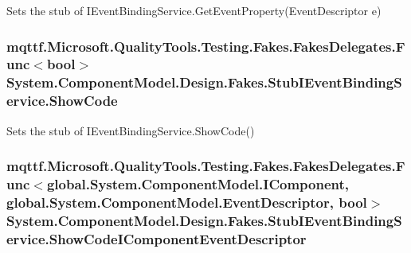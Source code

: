 Sets the stub of I\-Event\-Binding\-Service.\-Get\-Event\-Property(\-Event\-Descriptor e)

\hypertarget{class_system_1_1_component_model_1_1_design_1_1_fakes_1_1_stub_i_event_binding_service_a83adfa25a76ad4d628cec51592cec090}{
\subsubsection[{Show\-Code}]{\setlength{\rightskip}{0pt plus 5cm}mqttf.\-Microsoft.\-Quality\-Tools.\-Testing.\-Fakes.\-Fakes\-Delegates.\-Func$<$bool$>$ System.\-Component\-Model.\-Design.\-Fakes.\-Stub\-I\-Event\-Binding\-Service.\-Show\-Code}}\label{class_system_1_1_component_model_1_1_design_1_1_fakes_1_1_stub_i_event_binding_service_a83adfa25a76ad4d628cec51592cec090}


Sets the stub of I\-Event\-Binding\-Service.\-Show\-Code()

\hypertarget{class_system_1_1_component_model_1_1_design_1_1_fakes_1_1_stub_i_event_binding_service_a83e763ecbb9331896d2846ef0342cadc}{
\subsubsection[{Show\-Code\-I\-Component\-Event\-Descriptor}]{\setlength{\rightskip}{0pt plus 5cm}mqttf.\-Microsoft.\-Quality\-Tools.\-Testing.\-Fakes.\-Fakes\-Delegates.\-Func$<$global.\-System.\-Component\-Model.\-I\-Component, global.\-System.\-Component\-Model.\-Event\-Descriptor, bool$>$ System.\-Component\-Model.\-Design.\-Fakes.\-Stub\-I\-Event\-Binding\-Service.\-Show\-Code\-I\-Component\-Event\-Descriptor}}\label{class_system_1_1_component_model_1_1_design_1_1_fakes_1_1_stub_i_event_binding_service_a83e763ecbb9331896d2846ef0342cadc}


